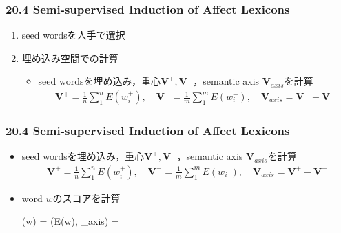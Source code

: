 
\begin{frame}
    \frametitle{20.4 Semi-supervised Induction of Affect Lexicons}
    \begin{enumerate}
        \item seed wordsを人手で選択
        \item 埋め込み空間での計算
        \begin{itemize}
            \item seed wordsを埋め込み，重心$\bm{V}^{+}, \bm{V}^{-}$，semantic axis $\bm{V}_{axis}$を計算
            {\footnotesize
                \begin{align*}
                    \bm{V}^{+} = \frac{1}{n} \sum_{1}^{n} E(w_{i}^{+}), \quad
                    \bm{V}^{-} = \frac{1}{m} \sum_{1}^{m} E(w_{i}^{-}), \quad
                    \bm{V}_{axis} = \bm{V}^{+} - \bm{V}^{-}
                \end{align*}
            }
        \end{itemize}
    \end{enumerate}
\end{frame}


\begin{frame}
    \frametitle{20.4 Semi-supervised Induction of Affect Lexicons}
    \begin{itemize}
        \item seed wordsを埋め込み，重心$\bm{V}^{+}, \bm{V}^{-}$，semantic axis $\bm{V}_{axis}$を計算
        {\footnotesize
            \begin{align*}
                \bm{V}^{+} = \frac{1}{n} \sum_{1}^{n} E(w_{i}^{+}), \quad
                \bm{V}^{-} = \frac{1}{m} \sum_{1}^{m} E(w_{i}^{-}), \quad
                \bm{V}_{axis} = \bm{V}^{+} - \bm{V}^{-}
            \end{align*}
        }
        \item word $w$のスコアを計算
        {\footnotesize
            \begin{yalign*}
                (w) = \cos(E(w), _{axis}) = 
            \end{yalign*}
        }
    \end{itemize}
\end{frame}


